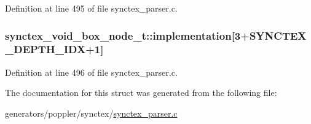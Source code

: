 Definition at line 495 of file synctex\+\_\+parser.\+c.

\hypertarget{structsynctex__void__box__node__t_a101b3430abcfd244d1dbbea260bd2bb2}{
\subsubsection[{implementation}]{ synctex\+\_\+void\+\_\+box\+\_\+node\+\_\+t\+::implementation\mbox{[}3+{\bf S\+Y\+N\+C\+T\+E\+X\+\_\+\+D\+E\+P\+T\+H\+\_\+\+I\+D\+X}+1\mbox{]}}}\label{structsynctex__void__box__node__t_a101b3430abcfd244d1dbbea260bd2bb2}


Definition at line 496 of file synctex\+\_\+parser.\+c.



The documentation for this struct was generated from the following file\+:\begin{DoxyCompactItemize}
\item 
generators/poppler/synctex/\hyperlink{synctex__parser_8c}{synctex\+\_\+parser.\+c}\end{DoxyCompactItemize}
